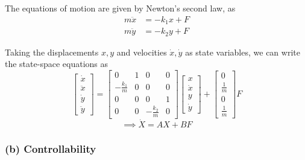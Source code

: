 The equations of motion are given by Newton's second law, as
\begin{align*}
    m\ddot{x}
     & = -k_{1}x + F
    \\
    m\ddot{y}
     & = -k_{2}y + F
\end{align*}

Taking the displacements \( x, y \) and velocities \( \dot{x}, \dot{y} \) as state variables, we can write the state-space equations as
\begin{equation*}
    \boxed{
        \begin{bmatrix}
            \dot{x}  \\
            \ddot{x} \\
            \dot{y}  \\
            \ddot{y}
        \end{bmatrix}
        =
        \begin{bmatrix}
            0                & 1 & 0                & 0 \\
            -\frac{k_{1}}{m} & 0 & 0                & 0 \\
            0                & 0 & 0                & 1 \\
            0                & 0 & -\frac{k_{2}}{m} & 0
        \end{bmatrix}
        \begin{bmatrix}
            x       \\
            \dot{x} \\
            y       \\
            \dot{y}
        \end{bmatrix}
        +
        \begin{bmatrix}
            0           \\
            \frac{1}{m} \\
            0           \\
            \frac{1}{m}
        \end{bmatrix}
        F
    }
\end{equation*}
\begin{equation*}
    \implies
    \dot X
    =
    AX + BF
\end{equation*}

\subsubsection*{(b) Controllability}

